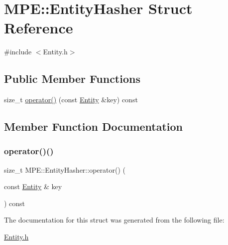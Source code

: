 \hypertarget{struct_m_p_e_1_1_entity_hasher}{}\section{M\+PE\+:\+:Entity\+Hasher Struct Reference}
\label{struct_m_p_e_1_1_entity_hasher}


{\ttfamily \#include $<$Entity.\+h$>$}

\subsection*{Public Member Functions}
\begin{DoxyCompactItemize}
\item 
size\+\_\+t \hyperlink{struct_m_p_e_1_1_entity_hasher_a31881f56120ff3a108eaa447c7093b96}{operator()} (const \hyperlink{struct_m_p_e_1_1_entity}{Entity} \&key) const
\end{DoxyCompactItemize}


\subsection{Member Function Documentation}
\mbox{\label{struct_m_p_e_1_1_entity_hasher_a31881f56120ff3a108eaa447c7093b96}} 
\subsubsection{\texorpdfstring{operator()()}{operator()()}}
{\footnotesize\ttfamily size\+\_\+t M\+P\+E\+::\+Entity\+Hasher\+::operator() (\begin{DoxyParamCaption}\item[{const \hyperlink{struct_m_p_e_1_1_entity}{Entity} \&}]{key }\end{DoxyParamCaption}) const\hspace{0.3cm}{\ttfamily [inline]}}



The documentation for this struct was generated from the following file\+:\begin{DoxyCompactItemize}
\item 
\hyperlink{_entity_8h}{Entity.\+h}\end{DoxyCompactItemize}
